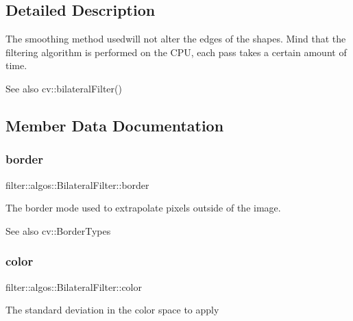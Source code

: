 \subsection{Detailed Description}
The smoothing method usedwill not alter the edges of the shapes. Mind that the filtering algorithm is performed on the C\+PU, each pass takes a certain amount of time. \begin{DoxySeeAlso}{See also}
cv\+::bilateral\+Filter() 
\end{DoxySeeAlso}


\subsection{Member Data Documentation}
\mbox{\label{classfilter_1_1algos_1_1_bilateral_filter_a0254db5121a0c78fcb46d824ab2069d3}} 
\subsubsection{\texorpdfstring{border}{border}}
{\footnotesize\ttfamily filter\+::algos\+::\+Bilateral\+Filter\+::border}

The border mode used to extrapolate pixels outside of the image. \begin{DoxySeeAlso}{See also}
cv\+::\+Border\+Types 
\end{DoxySeeAlso}
\mbox{\label{classfilter_1_1algos_1_1_bilateral_filter_a3cb2bbf9a7f536d9e706cab30b48f177}} 
\subsubsection{\texorpdfstring{color}{color}}
{\footnotesize\ttfamily filter\+::algos\+::\+Bilateral\+Filter\+::color}

The standard deviation in the color space to apply \mbox{\label{classfilter_1_1algos_1_1_bilateral_filter_aa5c6a1eb8e86de0868f87b58ac5ca8f5}} 
